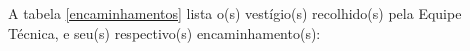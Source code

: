 \documentclass[a4paper,12pt,oneside]{article}
\newcommand{\fig}[3]{       %
	\begin{figure}[H]
		\centering
		\texttt{[image: \#1]}
		\settowidth{\imgwidth}{\texttt{[image: \#1]}}
		\captionsetup{width=\imgwidth}
		\caption{#2}
		\label{#3}
	\end{figure}
}
\newcommand{\f}[2]{\fig{#1.jpg}{#2}{#1}}
\newlength{\imgwidth}                     %
\newcounter{c}
\newcounter{d}
\newcounter{u}
\begin{document}









A tabela \ref{encaminhamentos} lista o(s) vestígio(s) recolhido(s) pela Equipe Técnica, e seu(s) respectivo(s) encaminhamento(s):
\end{document}
